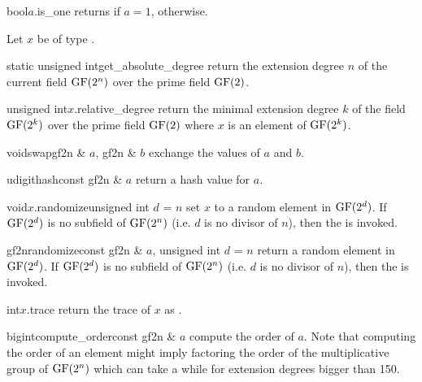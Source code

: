\begin{cfcode}{bool}{$a$.is_one}{}
  returns \TRUE if $a = 1$, \FALSE otherwise.
\end{cfcode}



\BASIC

Let $x$ be of type .

\begin{fcode}{static unsigned int}{get_absolute_degree}{}
  return the extension degree $n$ of the current field $\mathrm{GF}(2^n)$ over the prime field $\mathrm{GF}(2)$.
\end{fcode}

\begin{fcode}{unsigned int}{$x$.relative_degree}{}
  return the minimal extension degree $k$ of the field $\mathrm{GF}(2^k)$ over the prime field $\mathrm{GF}(2)$
  where $x$ is an element of $\mathrm{GF}(2^k)$.
\end{fcode}

\begin{fcode}{void}{swap}{gf2n & $a$, gf2n & $b$}
  exchange the values of $a$ and $b$.
\end{fcode}

\begin{fcode}{udigit}{hash}{const gf2n & $a$}
  return a hash value for $a$.
\end{fcode}

\begin{fcode}{void}{$x$.randomize}{unsigned int $d$ = $n$}
  set $x$ to a random element in $\mathrm{GF}(2^d)$.  If $\mathrm{GF}(2^d)$ is no subfield of $\mathrm{GF}(2^n)$ (i.e.
  $d$ is no divisor of $n$), then the \LEH is invoked.
\end{fcode}

\begin{fcode}{gf2n}{randomize}{const gf2n & $a$, unsigned int $d$ = $n$}
  return a random element in $\mathrm{GF}(2^d)$.  If $\mathrm{GF}(2^d)$ is no subfield of $\mathrm{GF}(2^n)$ (i.e. $d$
  is no divisor of $n$), then the \LEH is invoked.
\end{fcode}

\begin{fcode}{int}{$x$.trace}{}
  return the trace of $x$ as .
\end{fcode}



\HIGH

\begin{fcode}{bigint}{compute_order}{const gf2n & $a$}
  compute the order of $a$.  Note that computing the order of an element might imply factoring
  the order of the multiplicative group of $\mathrm{GF}(2^n)$ which can take a while for extension
  degrees bigger than 150.
\end{fcode}

